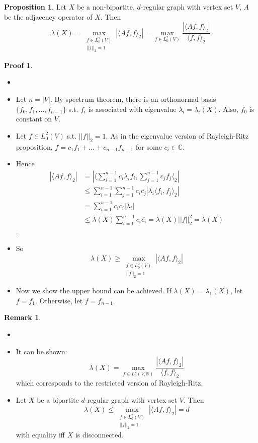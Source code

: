\documentclass{book}
\newcommand{\R}{\mathbb{R}}
\newcommand{\C}{\mathbb{C}}
\theoremstyle{definition}
\newtheorem{proposition}[lemma]{Proposition}
\theoremstyle{remarkstyle}
\newtheorem*{remark}{Remark}%
\newtheorem*{myproof}{Proof}%
\begin{document}
\begin{proposition}
    Let $X$ be a non-bipartite, $d$-regular graph with vertex set $V$, $A$ be the adjacency operator of $X$. Then $$\lambda(X)= \max_{\substack{f\in L^{2}_{0}(V) \\ ||f||_{2}=1}}|\langle Af , f \rangle_{2}| = \max_{f\in L^{2}_{0}(V)}\frac{|\langle Af, f \rangle_{2}|}{\langle f, f \rangle_{2}} $$
\end{proposition}
\begin{myproof}
    \begin{itemize}
        \item[]
        \item Let $n=|V|$. By spectrum theorem, there is an orthonormal basis $\{f_{0}, f_{1}, \dots, f_{n-1}\} $ s.t. $f_{i}$ is associated with eigenvalue $\lambda_{i}=\lambda_{i}(X) $. Also, $f_{0} $ is constant on $V$. 
        \item Let $f \in L^{2}_{0}(V) $ s.t. $||f||_{2} = 1 $. As in the eigenvalue version of Rayleigh-Ritz proposition, $f = c_{1}f_{1} + \dots + c_{n-1}f_{n-1}$ for some $c_{i} \in \C$.
        \item Hence
        \begin{align*}
            |\langle Af, f \rangle_{2}| &= |\langle \sum^{n-1}_{i=1}c_{i}\lambda_{i}f_{i}, \sum^{n-1}_{j=1}c_{j}f_{j} \langle_{2} | \\ &\le \sum^{n-1}_{i=1}\sum^{n-1}_{j=1}c_{i}\overline{c_{j}}|\lambda_{i}\langle f_{i}, f_{j}\rangle_{2}| \\ &= \sum^{n-1}_{i=1}c_{i}\overline{c_{i}}|\lambda_{i}| \\ &\le \lambda(X)\sum^{n-1}_{i=1}c_{i}\overline{c_{i}} = \lambda(X)||f||^{2}_{2} = \lambda(X)
        \end{align*}.
        \item So $$\lambda(X) \ge \max_{\substack{f\in L^{2}_{0}(V) \\ ||f||_{2}=1 }}|\langle Af, f \rangle_{2}|$$
        \item Now we show the upper bound can be achieved. If $\lambda(X) = \lambda_{1}(X)$, let $f=f_{1}$. Otherwise, let $f =f_{n-1} $. 
    \end{itemize}
\end{myproof}
\begin{remark}
    \begin{itemize}
        \item[]
        \item It can be shown: $$\lambda(X) = \max_{f\in L^{2}_{0}(V, \R) }\frac{|\langle Af, f\rangle_{2}|}{\langle f,f \rangle_{2}} $$ which corresponds to the restricted version of Rayleigh-Ritz. 
        \item Let $X$ be a bipartite $d$-regular graph with vertex set $V$. Then $$\lambda(X) \le \max_{\substack{f\in L^{2}_{0}(V) \\ ||f||_{2}=1 }}|\langle Af, f \rangle_{2}| = d  $$ with equality iff $X$ is disconnected. 
    \end{itemize}
\end{remark}
\end{document}
